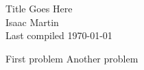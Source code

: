 


\pagestyle{empty}
	\LARGE
\begin{center}
	Title Goes Here \\
	\Large
	Isaac Martin \\
    Last compiled \today
\end{center}
\normalsize
\vspace{-2mm}
\hru
{}
\begin{homework}[e]
	\prob First problem
	 Another problem
\end{homework}

